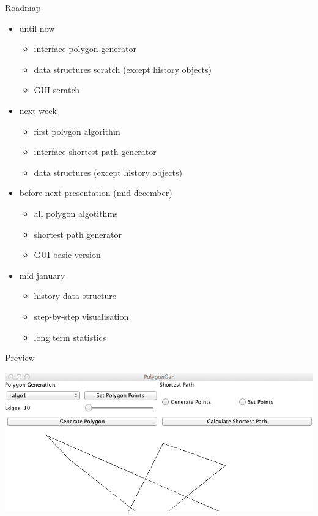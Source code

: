 \documentclass[ucs,11pt]{beamer}
\begin{document}
\begin{frame}{Roadmap}
  \begin{itemize}
    \item until now
      \begin{itemize}
        \item interface polygon generator
        \item data structures scratch (except history objects)
        \item GUI scratch
      \end{itemize}
      \item next week
      \begin{itemize}
        \item first polygon algorithm
        \item interface shortest path generator
        \item data structures (except history objects)
      \end{itemize}
      \item before next presentation (mid december)
        \begin{itemize}
          \item all polygon algotithms
          \item shortest path generator
          \item GUI basic version
        \end{itemize}
      \item mid january
        \begin{itemize}
          \item history data structure
          \item step-by-step visualisation
          \item long term statistics
        \end{itemize}
  \end{itemize}
\end{frame}

\begin{frame}{Preview}
  \begin{center}
	\includegraphics[width=1.00\textwidth]{PolygonGen.png}
\end{center}
\end{frame}
\end{document}
